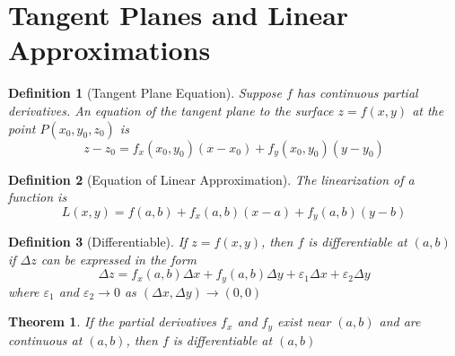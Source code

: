 \documentclass[10pt]{report}
\newtheorem{thm2}{Theorem}[section]
\newtheorem{def2}{Definition}[section]
\newcommand{\eps}{\varepsilon}
\begin{document}
\section{Tangent Planes and Linear Approximations}
\begin{def2}[Tangent Plane Equation]
Suppose $f$ has continuous partial derivatives. An equation of the tangent plane to the surface $z=f(x,y)$ at the point $P(x_0,y_0,z_0)$ is
$$z-z_0 = f_x(x_0,y_0)(x-x_0) + f_y(x_0,y_0)(y-y_0)$$
\end{def2}
\begin{def2}[Equation of Linear Approximation]
The linearization of a function is
$$L(x,y) = f(a,b) + f_x(a,b)(x-a) + f_y(a,b)(y-b)$$
\end{def2}
\begin{def2}[Differentiable]
If $z=f(x,y)$, then $f$ is differentiable at $(a,b)$ if $\Delta z$ can be expressed in the form
$$\Delta z = f_x(a,b)\Delta x + f_y(a,b)\Delta y + \eps_1\Delta x + \eps_2 \Delta y$$
where $\eps_1$ and $\eps_2\to 0$ as $(\Delta x,\Delta y)\to (0,0)$
\end{def2}
\begin{thm2}
If the partial derivatives $f_x$ and $f_y$ exist near $(a,b)$ and are continuous at $(a,b)$, then $f$ is differentiable at $(a,b)$
\end{thm2}
\end{document}
